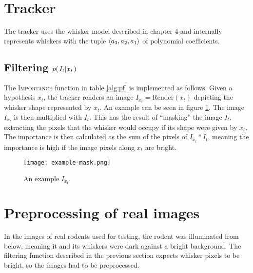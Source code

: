 \section{Tracker}

The tracker uses the whisker model described in chapter 4 and
internally represents whiskers with the tuple $\langle a_3, a_2, a_1 \rangle$ of polynomial
coefficients.

\subsection{Filtering $p{(\left. I_t \middle\vert x_t \right.)}$}

The \textsc{Importance} function in table \ref{alg:pf} is implemented
as follows. Given a hypothesis $x_t$, the tracker renders an image
$I_{x_t} = \text{Render}(x_t)$ depicting the whisker shape represented
by $x_t$. An example can be seen in figure \ref{fig:example-mask}. The
image $I_{x_t}$ is then multiplied with $I_t$. This has the result of
``masking'' the image $I_t$, extracting the pixels that the whisker
would occupy if its shape were given by $x_t$. The importance is then
calculated as the sum of the pixels of $I_{x_t} * I_t$, meaning
the importance is high if the image pixels along $x_t$ are bright.

\begin{figure}[h]
  \centering
  \texttt{[image: example-mask.png]}
  \caption{An example $I_{x_t}$.}
  \label{fig:example-mask}
\end{figure}


\section{Preprocessing of real images}
\label{prep-real}

In the images of real rodents used for testing, the rodent was
illuminated from below, meaning it and its whiskers were dark against
a bright background. The filtering function described in the previous
section expects whisker pixels to be bright, so the images had to be
preprocessed.
